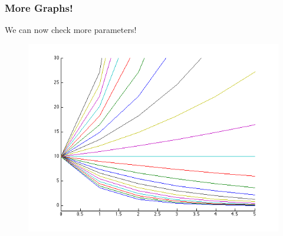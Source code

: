\documentclass[serif]{beamer}
\begin{document}
\begin{frame}
\frametitle{More Graphs!}

We can now check more parameters! 

\begin{figure}
\includegraphics[width=\textwidth,height=0.7\textheight]{./exp_color}
\end{figure}

\end{frame}
\end{document}
